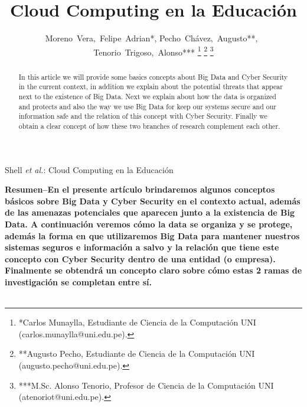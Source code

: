 \documentclass[journal]{IEEEtran}
\begin{document}
%
\title{Cloud Computing en la Educación}

\author{Moreno~Vera,~Felipe~Adrian*,\IEEEmembership{}
        Pecho~Chávez,~Augusto**,~\IEEEmembership{}
     	Tenorio~Trigoso,~Alonso***
\IEEEmembership{}
\thanks{*Carlos Munaylla, Estudiante de Ciencia de la Computación UNI (carlos.munaylla@uni.edu.pe). }
\thanks{**Augusto Pecho, Estudiante de Ciencia de la Computación UNI (augusto.pecho@uni.edu.pe). }
\thanks{***M.Sc. Alonso Tenorio, Profesor de Ciencia de la Computación UNI (atenoriot@uni.edu.pe). }
}


%
{Shell \MakeLowercase{\textit{et al.}}: Cloud Computing en la Educación}


\maketitle


\begin{abstract}
 In this article we will provide some basics concepts about Big Data and Cyber Security in the current context, in addition we explain about the potential threats that appear next to the existence of Big Data.
Next we explain about how the data is organized and protects and also the way we use Big Data for keep our systems secure and our information safe and the relation of this concept with Cyber Security.
Finally we obtain a clear concept of how these two branches of research complement each other.
\end{abstract}



\textbf{Resumen--En el presente artículo brindaremos algunos conceptos básicos sobre Big Data y Cyber Security en el contexto actual, además de las amenazas potenciales que aparecen junto a la existencia de Big Data.
A continuación veremos cómo la data se organiza y se protege, además la forma en que utilizaremos Big Data para mantener nuestros sistemas seguros e información a salvo y la relación que tiene este concepto con Cyber Security dentro de una entidad (o empresa).
Finalmente se obtendrá un concepto claro sobre cómo estas 2 ramas de investigación se completan entre sí.}\\ \\
\end{document}
